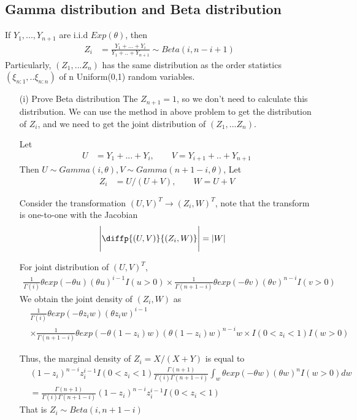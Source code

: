 \subsection{Gamma distribution and Beta distribution}
If $Y_1, ..., Y_{n+1}$ are i.i.d $Exp(\theta)$, then 
\begin{align*}
	Z_i &= \frac{Y_1 + ...+ Y_i}{Y_1+ .. + Y_{n+1}} \sim Beta(i, n-i+1) 
\end{align*}
Particularly, $(Z_1, ... Z_n)$ has the same distribution as the order statistics $(\xi_{n:1}, .. \xi_{n:n})$ of n Uniform(0,1) random variables.

\begin{itemize}
\item[(i)]
Prove Beta distribution
The $Z_{n+1} = 1$, so we don't need to calculate this distribution. 
We can use the method in above problem to get the distribution of $Z_i$, and we need to get the joint distribution of $(Z_1, ... Z_n)$.

Let 
\begin{align*}
	U &=Y_1 + ...+ Y_i, \qquad V= Y_{i+1}+ .. + Y_{n+1} 
\end{align*}
Then $U \sim Gamma(i, \theta), V \sim Gamma(n+1-i, \theta)$, Let
\begin{align*}
 	Z_i &= U/(U+V), \qquad W = U+V 
\end{align*}

Consider the transformation $(U,V)^T \rightarrow (Z_i, W)^T$, note that the transform is one-to-one with the Jacobian
\begin{align*}
	\Bigg |\diffp{(U,V)}{{(Z_i, W)}} \Bigg | &= |W|
\end{align*}
 
For joint distribution of  $(U,V)^T$, 
\begin{align*}
	\frac{1}{\Gamma{(i)}} \theta exp(-\theta u) (\theta u)^{i-1} I(u > 0) \times \frac{1}{\Gamma{(n+1-i)}} \theta exp(-\theta v) (\theta v)^{n-i} I(v > 0)
\end{align*}
We obtain the joint density of $(Z_i, W)$ as 
\begin{align*}
&	\frac{1}{\Gamma{(i)}} \theta exp(-\theta z_i w) (\theta z_i w)^{i-1} \\
	& \times \frac{1}{\Gamma{(n+1-i)}} \theta exp(-\theta (1-z_i) w) (\theta (1-z_i) w)^{n-i} w \times I(0< z_i< 1) I(w > 0)
\end{align*}

Thus, the marginal density of $Z_i = X/(X+Y)$ is equal to
\begin{align*}
 & (1-z_i)^{n-i} z_i^{i-1} I(0< z_i <1)	\frac{\Gamma(n+1)}{\Gamma(i) \Gamma(n+1-i)} \int_{w} \theta exp(-\theta w) (\theta w)^n I(w>0) 	dw \\
 &= \frac{\Gamma(n+1)}{\Gamma(i) \Gamma(n+1-i)} (1-z_i)^{n-i} z_i^{i-1} I(0< z_i <1)
\end{align*}
That is $Z_i \sim Beta(i, n+1-i)$

\end{itemize}